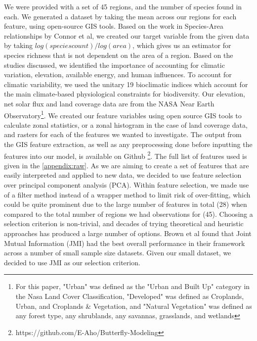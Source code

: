 \documentclass[prl,showpacs,superscriptaddress,twocolumn,longbibliography]{revtex4-1}
\begin{document}
\noindent 
\newline
{}
We were provided with a set of 45 regions, and the number of species found in each. We generated a dataset by taking the mean across our regions for each feature, using open-source GIS tools.
\newline
\newline
Based on the work in Species-Area relationships by Connor et al\cite{connor_2001_sar}, we created our target variable from the given data by taking $log(species count)/log(area)$, which gives us an estimator for species richness that is not dependent on the area of a region. Based on the studies discussed, we identified the importance of accounting for climatic variation, elevation, available energy, and human influences.  To account for climatic variability, we used the unitary 19 bioclimatic indices which account for the main climate-based physiological constraints for biodiversity\cite{hijmans_very_2005}. Our elevation, net solar flux and land coverage data are from the NASA Near Earth Observatory\cite{}\footnote{For this paper, "Urban" was defined as the "Urban and Built Up" category in the Nasa Land Cover Classification, "Developed" was defined as Croplands, Urban, and Croplands & Vegetation, and "Natural Vegetation" was defined as any forest type, any shrublands, any savannas, grasslands, and wetlands}. We created our feature variables using open source GIS tools\cite{QGIS_software} to calculate zonal statistics, or a zonal histogram in the case of land coverage data, and rasters for each of the features we wanted to investigate. The output from the GIS feature extraction, as well as any preprocessing done before inputting the features into our model, is available on Github \footnote{https://github.com/E-Aho/Butterfly-Modeling}. The full list of features used is given in the \ref{appendix:raw}.
\newline
\newline
As we are aiming to create a set of features that are easily interpreted and applied to new data, we decided to use feature selection over principal component analysis (PCA). Within feature selection, we made use of a filter method instead of a wrapper method to limit risk of over-fitting, which could be quite prominent due to the large number of features in total (28) when compared to the total number of regions we had observations for (45).
\newline
\newline
Choosing a selection criterion is non-trivial, and decades of trying theoretical and heuristic approaches has produced a large number of options. Brown et al\cite{Brown2012} found that Joint Mutual Information (JMI)\cite{yang_data_2012} had the best overall performance in their framework across a number of small sample size datasets. Given our small dataset, we decided to use JMI as our selection criterion.
\end{document}
